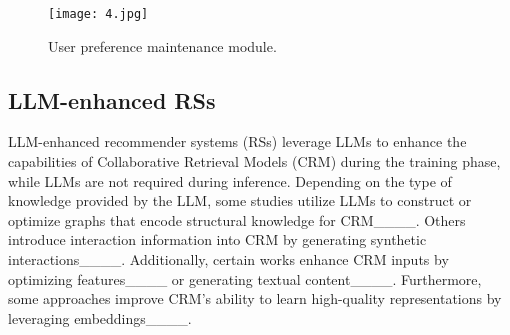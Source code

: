 \begin{figure}[t]
  \centering
  \texttt{[image: 4.jpg]}
  \caption{User preference maintenance module.}
  \label{fig:8mke}
\end{figure}

\subsection{LLM-enhanced RSs}
LLM-enhanced recommender systems (RSs) leverage LLMs to enhance the capabilities of Collaborative Retrieval Models (CRM) during the training phase, while LLMs are not required during inference. Depending on the type of knowledge provided by the LLM, some studies utilize LLMs to construct or optimize graphs that encode structural knowledge for CRM____. Others introduce interaction information into CRM by generating synthetic interactions____. Additionally, certain works enhance CRM inputs by optimizing features____ or generating textual content____. Furthermore, some approaches improve CRM’s ability to learn high-quality representations by leveraging embeddings____.